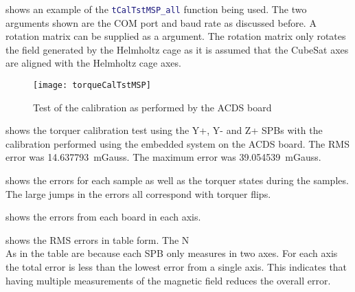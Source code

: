  shows an example of the \lstinline[style=code,language=Matlab]$tCalTstMSP_all$ function being used. The two arguments shown are the COM port and baud rate as discussed before. A rotation matrix can be supplied as a  argument. The rotation matrix only rotates the field generated by the Helmholtz cage as it is assumed that the CubeSat axes are aligned with the Helmholtz cage axes.

\begin{figure}[!ht]
    \centering
    \texttt{[image: torqueCalTstMSP]}
    \caption{Test of the calibration as performed by the \ac{ACDS} board}
    \label{fig:tcalMSP}
\end{figure}

 shows the torquer calibration test using the Y+, Y- and Z+ \acp{SPB} with the calibration performed using the embedded system on the \ac{ACDS} board. The RMS error was 14.637793~mGauss. The maximum error was 39.054539~mGauss.


 shows the errors for each sample as well as the torquer states during the samples. The large jumps in the errors all correspond with torquer flips.


 shows the errors from each board in each axis.

 shows the RMS errors in table form. The N\\As in the table are because each \ac{SPB} only measures in two axes. For each axis the total error is less than the lowest error from a single axis. This indicates that having multiple measurements of the magnetic field reduces the overall error.

